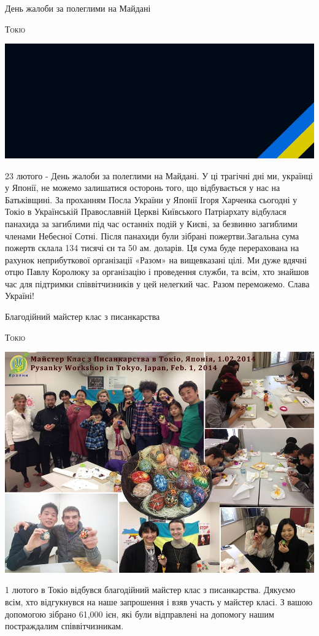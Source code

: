 \documentclass[10pt,a4paper]{article}
\newcommand{\NewsItem}[1]{%
		\usefont{T2A}{iwona}{m}{n} 
		\large #1 \vspace{4pt}
		\par \normalsize \normalfont}
\newcommand{\NewsAuthor}[1]{%
			\hfill \textsc{#1} \vspace{4pt}
			\par \normalfont}
\begin{document}
\newpage

\begin{multicols}{3}

\NewsItem{День жалоби за полеглими на Майдані}
\NewsAuthor{Токіо}
		\begin{center}
			\includegraphics[width=0.8\linewidth]{images/den-zhaloby}
		\end{center}
23 лютого - День жалоби за полеглими на Майдані. У ці трагічні дні ми, українці у Японії, не можемо залишатися осторонь того, що відбувається у нас на Батьківщині.
За проханням Посла України у Японії Ігоря Харченка сьогодні у Токіо в Українській Православній Церкві Київського Патріархату відбулася панахида за загиблими під час останніх подій у Києві, за безвинно загиблими членами Небесної Сотні.
Після панахиди були зібрані пожертви.Загальна сума пожертв склала 134 тисячі єн та 50 ам. доларів. Ця сума буде перерахована на рахунок неприбуткової організації «Разом» на вищевказані цілі.
Ми дуже вдячні отцю Павлу Королюку за організацію і проведення служби, та всім, хто знайшов час для підтримки співвітчизників у цей нелегкий час.
Разом переможемо. Слава Україні!

\vspace{1cm}
\NewsItem{Благодійний майстер клас з писанкарства}
\NewsAuthor{Токіо}
		\begin{center}
			\includegraphics[width=0.8\linewidth]{images/pysankarstvo}
		\end{center}
1 лютого в Токіо відбувся благодійний майстер клас з писанкарства. 
Дякуємо всім, хто відгукнувся на наше запрошення і взяв участь у майстер класі. З вашою допомогою зібрано 61,000 ієн, які були відправлені на допомогу нашим постраждалим співвітчизникам.


\end{multicols}
\end{document}
